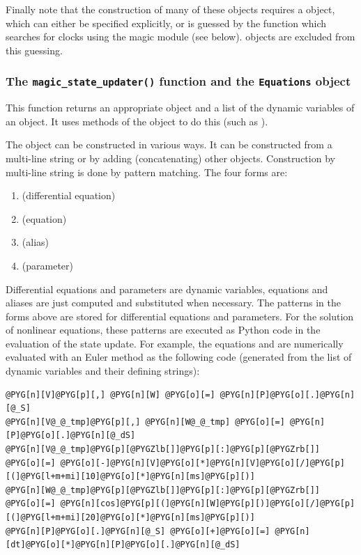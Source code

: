 \documentclass[letterpaper,10pt,english]{manual}
\begin{document}
Finally note that the construction of many of these objects requires a
 object, which can either be specified explicitly, or is guessed
by the  function which searches for clocks using the magic
module (see below).  objects are excluded from this guessing.


\subsubsection{The \texttt{magic\_state\_updater()} function and the \texttt{Equations} object}

This function returns an appropriate  object and a list of
the dynamic variables of an  object. It uses methods of the
 object to do this (such as ).

The  object can be constructed in various ways. It can be
constructed from a multi-line string or by adding (concatenating) other
 objects. Construction by multi-line string is done by
pattern matching. The four forms are:
\begin{enumerate}
\item {} 
 (differential equation)

\item {} 
 (equation)

\item {} 
 (alias)

\item {} 
 (parameter)

\end{enumerate}

Differential equations and parameters are dynamic variables, equations and
aliases are just computed and substituted when necessary. The  patterns in
the forms above are stored for differential equations and parameters. For the
solution of nonlinear equations, these  patterns are executed as Python
code in the evaluation of the state update. For example, the equations
 and  are
numerically evaluated with an Euler method
as the following code (generated from the list of dynamic variables and their
defining strings):

\begin{Verbatim}[commandchars=@\[\]]
@PYG[n][V]@PYG[p][,] @PYG[n][W] @PYG[o][=] @PYG[n][P]@PYG[o][.]@PYG[n][@_S]
@PYG[n][V@_@_tmp]@PYG[p][,] @PYG[n][W@_@_tmp] @PYG[o][=] @PYG[n][P]@PYG[o][.]@PYG[n][@_dS]
@PYG[n][V@_@_tmp]@PYG[p][@PYGZlb[]]@PYG[p][:]@PYG[p][@PYGZrb[]] @PYG[o][=] @PYG[o][-]@PYG[n][V]@PYG[o][*]@PYG[n][V]@PYG[o][/]@PYG[p][(]@PYG[l+m+mi][10]@PYG[o][*]@PYG[n][ms]@PYG[p][)]
@PYG[n][W@_@_tmp]@PYG[p][@PYGZlb[]]@PYG[p][:]@PYG[p][@PYGZrb[]] @PYG[o][=] @PYG[n][cos]@PYG[p][(]@PYG[n][W]@PYG[p][)]@PYG[o][/]@PYG[p][(]@PYG[l+m+mi][20]@PYG[o][*]@PYG[n][ms]@PYG[p][)]
@PYG[n][P]@PYG[o][.]@PYG[n][@_S] @PYG[o][+]@PYG[o][=] @PYG[n][dt]@PYG[o][*]@PYG[n][P]@PYG[o][.]@PYG[n][@_dS]
\end{Verbatim}
\end{document}

